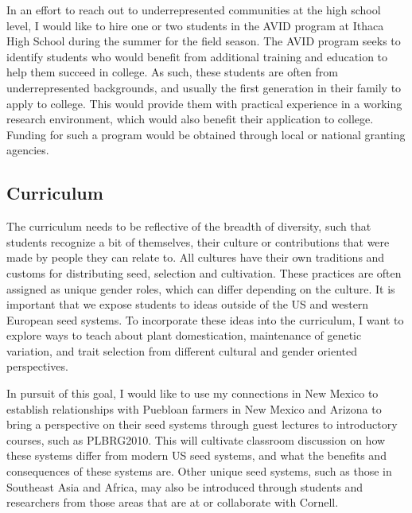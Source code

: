 \documentclass[11pt]{article}
\begin{document}
In an effort to reach out to underrepresented communities at the high school level, I would like to hire one or two students in the AVID program at Ithaca High School during the summer for the field season. The AVID program seeks to identify students who would benefit from additional training and education to help them succeed in college. As such, these students are often from underrepresented backgrounds, and usually the first generation in their family to apply to college. This would provide them with practical  experience in a working research environment, which would also benefit their application to college. Funding for such a program would be obtained through local or national granting agencies.

\subsection*{Curriculum}

The curriculum needs to be reflective of the breadth of diversity, such that students recognize a bit of themselves, their culture or contributions that were made by people they can relate to. All cultures have their own traditions and customs for distributing seed, selection and cultivation. These practices are often assigned as unique gender roles, which can differ depending on the culture. It is important that we expose students to ideas outside of the US and western European seed systems. To incorporate these ideas into the curriculum, I want to explore ways to teach about plant domestication, maintenance of genetic variation, and trait selection from different cultural and gender oriented perspectives. 

In pursuit of this goal, I would like to use my connections in New Mexico to establish relationships with Puebloan farmers in New Mexico and Arizona to bring a perspective on their seed systems through guest lectures to introductory courses, such as PLBRG2010. This will cultivate classroom discussion on how these systems differ from modern US seed systems, and what the benefits and consequences of these systems are. Other unique seed systems, such as those in Southeast Asia and Africa, may also be introduced through students and researchers from those areas that are at or collaborate with Cornell. %

\end{document}
